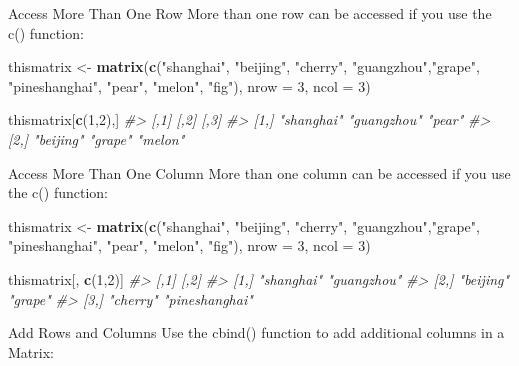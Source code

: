 \documentclass[
]{book}
\newenvironment{Shaded}{\begin{snugshade}}{\end{snugshade}}
\newcommand{\AttributeTok}[1]{\textcolor[rgb]{0.13,0.29,0.53}{#1}}
\newcommand{\CommentTok}[1]{\textcolor[rgb]{0.56,0.35,0.01}{\textit{#1}}}
\newcommand{\DecValTok}[1]{\textcolor[rgb]{0.00,0.00,0.81}{#1}}
\newcommand{\FunctionTok}[1]{\textcolor[rgb]{0.13,0.29,0.53}{\textbf{#1}}}
\newcommand{\NormalTok}[1]{#1}
\newcommand{\OtherTok}[1]{\textcolor[rgb]{0.56,0.35,0.01}{#1}}
\newcommand{\StringTok}[1]{\textcolor[rgb]{0.31,0.60,0.02}{#1}}
\begin{document}
Access More Than One Row
More than one row can be accessed if you use the c() function:

\begin{Shaded}
\begin{Highlighting}[]
\NormalTok{thismatrix }\OtherTok{\textless{}{-}} \FunctionTok{matrix}\NormalTok{(}\FunctionTok{c}\NormalTok{(}\StringTok{"shanghai"}\NormalTok{, }\StringTok{"beijing"}\NormalTok{, }\StringTok{"cherry"}\NormalTok{, }\StringTok{"guangzhou"}\NormalTok{,}\StringTok{"grape"}\NormalTok{, }\StringTok{"pineshanghai"}\NormalTok{, }\StringTok{"pear"}\NormalTok{, }\StringTok{"melon"}\NormalTok{, }\StringTok{"fig"}\NormalTok{), }\AttributeTok{nrow =} \DecValTok{3}\NormalTok{, }\AttributeTok{ncol =} \DecValTok{3}\NormalTok{)}

\NormalTok{thismatrix[}\FunctionTok{c}\NormalTok{(}\DecValTok{1}\NormalTok{,}\DecValTok{2}\NormalTok{),]}
\CommentTok{\#\textgreater{}      [,1]       [,2]        [,3]   }
\CommentTok{\#\textgreater{} [1,] "shanghai" "guangzhou" "pear" }
\CommentTok{\#\textgreater{} [2,] "beijing"  "grape"     "melon"}
\end{Highlighting}
\end{Shaded}

Access More Than One Column
More than one column can be accessed if you use the c() function:

\begin{Shaded}
\begin{Highlighting}[]
\NormalTok{thismatrix }\OtherTok{\textless{}{-}} \FunctionTok{matrix}\NormalTok{(}\FunctionTok{c}\NormalTok{(}\StringTok{"shanghai"}\NormalTok{, }\StringTok{"beijing"}\NormalTok{, }\StringTok{"cherry"}\NormalTok{, }\StringTok{"guangzhou"}\NormalTok{,}\StringTok{"grape"}\NormalTok{, }\StringTok{"pineshanghai"}\NormalTok{, }\StringTok{"pear"}\NormalTok{, }\StringTok{"melon"}\NormalTok{, }\StringTok{"fig"}\NormalTok{), }\AttributeTok{nrow =} \DecValTok{3}\NormalTok{, }\AttributeTok{ncol =} \DecValTok{3}\NormalTok{)}

\NormalTok{thismatrix[, }\FunctionTok{c}\NormalTok{(}\DecValTok{1}\NormalTok{,}\DecValTok{2}\NormalTok{)]}
\CommentTok{\#\textgreater{}      [,1]       [,2]          }
\CommentTok{\#\textgreater{} [1,] "shanghai" "guangzhou"   }
\CommentTok{\#\textgreater{} [2,] "beijing"  "grape"       }
\CommentTok{\#\textgreater{} [3,] "cherry"   "pineshanghai"}
\end{Highlighting}
\end{Shaded}

Add Rows and Columns
Use the cbind() function to add additional columns in a Matrix:
\end{document}
